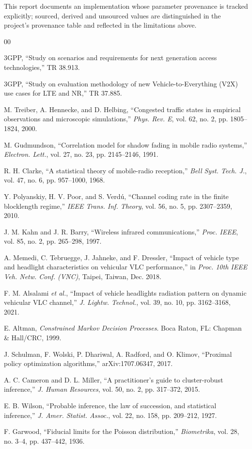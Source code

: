 \documentclass[conference]{IEEEtran}
\begin{document}
This report documents an implementation whose parameter provenance is tracked
explicitly; sourced, derived and unsourced values are distinguished in the
project's provenance table and reflected in the limitations above.

\begin{thebibliography}{00}

 3GPP, ``Study on scenarios and requirements for next
generation access technologies,'' TR 38.913.

 3GPP, ``Study on evaluation methodology of new
Vehicle-to-Everything (V2X) use cases for LTE and NR,'' TR 37.885.

 M. Treiber, A. Hennecke, and D. Helbing, ``Congested
traffic states in empirical observations and microscopic simulations,''
\emph{Phys. Rev. E}, vol. 62, no. 2, pp. 1805--1824, 2000.

 M. Gudmundson, ``Correlation model for shadow fading
in mobile radio systems,'' \emph{Electron. Lett.}, vol. 27, no. 23,
pp. 2145--2146, 1991.

 R. H. Clarke, ``A statistical theory of mobile-radio
reception,'' \emph{Bell Syst. Tech. J.}, vol. 47, no. 6, pp. 957--1000, 1968.

 Y. Polyanskiy, H. V. Poor, and S. Verd\'u, ``Channel coding
rate in the finite blocklength regime,'' \emph{IEEE Trans. Inf. Theory},
vol. 56, no. 5, pp. 2307--2359, 2010.

 J. M. Kahn and J. R. Barry, ``Wireless infrared
communications,'' \emph{Proc. IEEE}, vol. 85, no. 2, pp. 265--298, 1997.

 A. Memedi, C. Tebruegge, J. Jahneke, and F. Dressler,
``Impact of vehicle type and headlight characteristics on vehicular VLC
performance,'' in \emph{Proc. 10th IEEE Veh. Netw. Conf. (VNC)}, Taipei,
Taiwan, Dec. 2018.

 F. M. Alsalami \emph{et al.}, ``Impact of vehicle
headlights radiation pattern on dynamic vehicular VLC channel,''
\emph{J. Lightw. Technol.}, vol. 39, no. 10, pp. 3162--3168, 2021.

 E. Altman, \emph{Constrained Markov Decision Processes}.
Boca Raton, FL: Chapman \& Hall/CRC, 1999.

 J. Schulman, F. Wolski, P. Dhariwal, A. Radford, and
O. Klimov, ``Proximal policy optimization algorithms,'' arXiv:1707.06347,
2017.

 A. C. Cameron and D. L. Miller, ``A practitioner's guide
to cluster-robust inference,'' \emph{J. Human Resources}, vol. 50, no. 2,
pp. 317--372, 2015.

 E. B. Wilson, ``Probable inference, the law of
succession, and statistical inference,'' \emph{J. Amer. Statist. Assoc.},
vol. 22, no. 158, pp. 209--212, 1927.

 F. Garwood, ``Fiducial limits for the Poisson
distribution,'' \emph{Biometrika}, vol. 28, no. 3--4, pp. 437--442, 1936.

\end{thebibliography}
\end{document}
